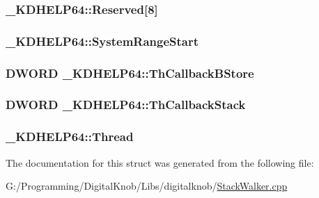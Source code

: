\hypertarget{struct___k_d_h_e_l_p64_add616dfa495e3dbbbaa828d104e76011}{
\subsubsection[{Reserved}]{ \-\_\-\-K\-D\-H\-E\-L\-P64\-::\-Reserved\mbox{[}8\mbox{]}}}\label{struct___k_d_h_e_l_p64_add616dfa495e3dbbbaa828d104e76011}
\hypertarget{struct___k_d_h_e_l_p64_a631c21491404182176adfecb74acd939}{
\subsubsection[{System\-Range\-Start}]{ \-\_\-\-K\-D\-H\-E\-L\-P64\-::\-System\-Range\-Start}}\label{struct___k_d_h_e_l_p64_a631c21491404182176adfecb74acd939}
\hypertarget{struct___k_d_h_e_l_p64_a2627f807de1ce437da69006f3f827e11}{
\subsubsection[{Th\-Callback\-B\-Store}]{\setlength{\rightskip}{0pt plus 5cm}D\-W\-O\-R\-D \-\_\-\-K\-D\-H\-E\-L\-P64\-::\-Th\-Callback\-B\-Store}}\label{struct___k_d_h_e_l_p64_a2627f807de1ce437da69006f3f827e11}
\hypertarget{struct___k_d_h_e_l_p64_a2960c0312baa12750404454f5a550930}{
\subsubsection[{Th\-Callback\-Stack}]{\setlength{\rightskip}{0pt plus 5cm}D\-W\-O\-R\-D \-\_\-\-K\-D\-H\-E\-L\-P64\-::\-Th\-Callback\-Stack}}\label{struct___k_d_h_e_l_p64_a2960c0312baa12750404454f5a550930}
\hypertarget{struct___k_d_h_e_l_p64_ad54883742842530e7313e9232ab58693}{
\subsubsection[{Thread}]{ \-\_\-\-K\-D\-H\-E\-L\-P64\-::\-Thread}}\label{struct___k_d_h_e_l_p64_ad54883742842530e7313e9232ab58693}


The documentation for this struct was generated from the following file\-:\begin{DoxyCompactItemize}
\item 
G\-:/\-Programming/\-Digital\-Knob/\-Libs/digitalknob/\hyperlink{_stack_walker_8cpp}{Stack\-Walker.\-cpp}\end{DoxyCompactItemize}
